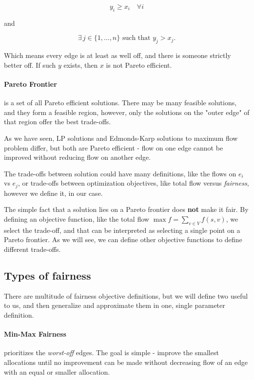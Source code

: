 \documentclass[12pt, openany]{article}
\begin{document}
\[
y_i \ge x_i \quad \forall i
\]

and

\[
\exists\, j \in \{1,\dots,n\} \text{ such that } y_j > x_j.
\]

Which means every edge is at least as well off, and there is someone strictly better off. If such $y$ exists, then $x$ is not Pareto efficient.

\paragraph{\textbf{Pareto Frontier}} is a set of all Pareto efficient solutions. There may be many feasible solutions, and they form a feasible region, however, only the solutions on the "outer edge" of that region offer the best trade-offs.

As we have seen, LP solutions and Edmonds-Karp solutions to maximum flow problem differ, but both are Pareto efficient - flow on one edge cannot be improved without reducing flow on another edge.

The trade-offs between solution could have many definitions, like the flows on $e_i$ vs $e_j$, or trade-offs between optimization objectives, like total flow versus \textit{fairness}, however we define it, in our case.

The simple fact that a solution lies on a Pareto frontier does \textbf{not} make it fair. By defining an objective function, like the total flow \( \max f = \sum_{v \in V} f(s,v) \), we select the trade-off, and that can be interpreted as selecting a single point on a Pareto frontier. As we will see, we can define other objective functions to define different trade-offs.

\subsection{Types of fairness}
There are multitude of fairness objective definitions, but we will define two useful to us, and then generalize and approximate them in one, single parameter definition.

\paragraph{\textbf{Min-Max Fairness}} prioritizes the \textit{worst-off} edges. The goal is simple - improve the smallest allocations until no improvement can be made without decreasing flow of an edge with an equal or smaller allocation.
\end{document}
